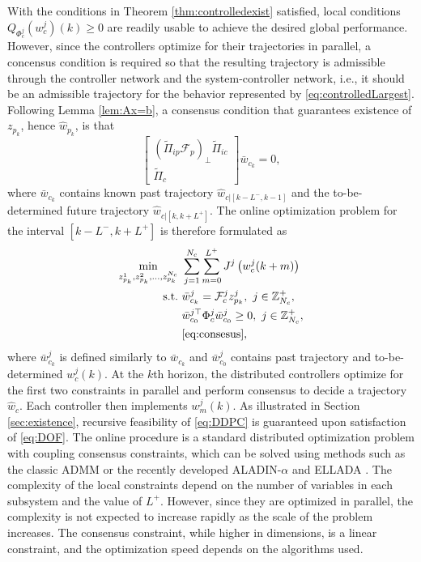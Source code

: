 \documentclass[11pt,print,draftcls,onecolumn,romanappendices]{ieeecolor}
\newcommand{\Zp}[1]{\mathbb{Z}^+_{#1}}
\newcommand{\revise}[1]{{\color{black} #1}}
\newcommand{\F}{\mathcal{F}}
\newcommand{\bint}[1]{{|[#1]}}
\begin{document}
\revise{With the conditions in Theorem \ref{thm:controlledexist} satisfied, local conditions $Q_{\Phi_c^j}(w_c^j)(k)\geq0$ are readily usable to achieve the desired global performance. However, since the controllers optimize for their trajectories in parallel, a concensus condition is required so that the resulting trajectory is admissible through the controller network and the system-controller network, i.e., it should be an admissible trajectory for the behavior represented by \eqref{eq:controlledLargest}. Following Lemma \ref{lem:Ax=b}, a consensus condition that guarantees existence of $z_{p_k}$, hence $\hat{w}_{p_k}$, is that 
\begin{equation}\label{eq:consesus}
    \begin{bmatrix}
        (\widetilde{\Pi}_{ip}\F_p)_\perp \widetilde{\Pi}_{ic}\\ \widetilde{\Pi}_c
    \end{bmatrix}\bar{w}_{c_k}=0,
\end{equation}
where $\bar{w}_{c_k}$ contains known past trajectory $\hat{w}_{c\bint{k-L^-,k-1}}$ and the to-be-determined future trajectory $\hat{w}_{c\bint{k,k+L^+}}$. The online optimization problem for the interval $[k-L^-,k+L^+]$ is therefore formulated as
\begin{equation}\label{eq:DDPC}
	\begin{split}
		\min_{z_{p_k}^1,z_{p_k}^2,\ldots,z_{p_k}^{N_c}} \ &\sum_{j=1}^{N_c}\sum_{m=0}^{L^+}{\revise{J^j}}\left(w_{c}^j(k+m)\right)\\
		\mathrm{s.t.} \ & \bar{w}_{c_k}^j=\F_c^jz_{p_k}^j,\ j\in\Zp{N_c},\\
		& \bar{w}_{c_0}^{j\top}\Phi_c^j\bar{w}_{c_0}^j\geq0, \ j\in\Zp{N_c},\\
		& \eqref{eq:consesus},
	\end{split}  
\end{equation}
where $\bar{w}_{c_k}^j$ is defined similarly to $\bar{w}_{c_k}$ and $\bar{w}_{c_0}^j$ contains past trajectory and to-be-determined $w_c^j(k)$. At the $k$th horizon, the distributed controllers optimize for the first two constraints in parallel and perform consensus to decide a trajectory $\hat{w}_c$. Each controller then implements $w_m^j(k)$.} As illustrated in Section \ref{sec:existence}, recursive feasibility of \eqref{eq:DDPC} is guaranteed upon satisfaction of \eqref{eq:DOF}. The online procedure is a standard distributed optimization problem with coupling consensus constraints, which can be solved using methods such as the classic ADMM \cite{Boyd:2011} or the recently developed ALADIN-$\alpha$ \cite{Engelmann:2020} and ELLADA \cite{Tang:2021}. \revise{The complexity of the local constraints depend on the number of variables in each subsystem and the value of $L^+$. However, since they are optimized in parallel, the complexity is not expected to increase rapidly as the scale of the problem increases. The consensus constraint, while higher in dimensions, is a linear constraint, and the optimization speed depends on the algorithms used.
}
\end{document}
